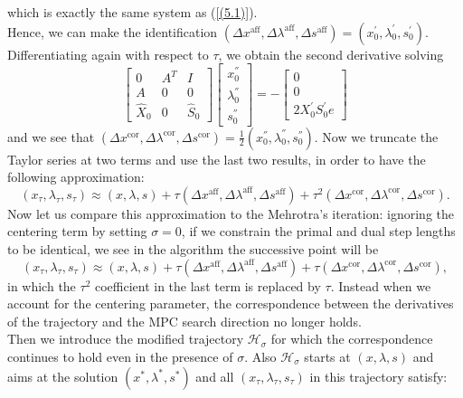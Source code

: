\documentclass[a4paper,10 pt,titlepage,twoside]{book}
\theoremstyle{plain}
\theoremstyle{definition}
\theoremstyle{remark}
\begin{document}
which is exactly the same system as (\ref{(5.1)}).\\
Hence, we can make the identification $(\Delta x^{\text{aff}},\Delta \lambda^{\text{aff}},\Delta s^{\text{aff}})=(x^{'}_{0},\lambda^{'}_{0},s^{'}_{0})$. Differentiating again with respect to $\tau$, we obtain the second derivative solving
\begin{equation*}
\begin{bmatrix}
0&A^{T}&I \\A&0&0\\\hat{X}_{0}&0&\hat{S}_{0}
\end{bmatrix}\begin{bmatrix}
x_{0}^{''}\\\lambda_{0}^{''}\\s_{0}^{''}
\end{bmatrix}=-\begin{bmatrix}
0\\0\\2X^{'}_{0}S^{'}_{0}e
\end{bmatrix}
\end{equation*}
and we see that $(\Delta x^{\text{cor}},\Delta \lambda^{\text{cor}},\Delta s^{\text{cor}})=\frac{1}{2}(x^{''}_{0},\lambda^{''}_{0},s^{''}_{0})$. Now we truncate the Taylor series at two terms and use the last two results, in order to have the following approximation:
\begin{equation*}
(x_{\tau},\lambda_{\tau}, s_{\tau})\approx(x, \lambda, s)+ \tau(\Delta x^{\text{aff}},\Delta \lambda^{\text{aff}},\Delta s^{\text{aff}})+\tau^{2}(\Delta x^{\text{cor}},\Delta \lambda^{\text{cor}},\Delta s^{\text{cor}}).
\end{equation*}
Now let us compare this approximation to the Mehrotra's iteration: ignoring the centering term by setting $\sigma =0$, if we constrain the primal and dual step lengths to be identical, we see in the algorithm the successive point will be
\begin{equation}
(x_{\tau},\lambda_{\tau}, s_{\tau})\approx(x, \lambda, s)+ \tau(\Delta x^{\text{aff}},\Delta \lambda^{\text{aff}},\Delta s^{\text{aff}})+\tau(\Delta x^{\text{cor}},\Delta \lambda^{\text{cor}},\Delta s^{\text{cor}}),
\end{equation} 
in which the $\tau^{2}$ coefficient in the last term is replaced by $\tau$. Instead when we account for the centering parameter, the correspondence between the derivatives of the trajectory and the MPC search direction no longer holds. \\
Then we introduce the modified trajectory $\mathcal{H}_{\sigma}$ for which the correspondence continues to hold even in the presence of $\sigma$. Also $\mathcal{H}_{\sigma}$ starts at $(x, \lambda, s)$ and aims at the solution $(x^{*},\lambda^{*},s^{*})$ and all $(x_{\tau},\lambda_{\tau},s_{\tau})$ in this trajectory satisfy:
\end{document}
